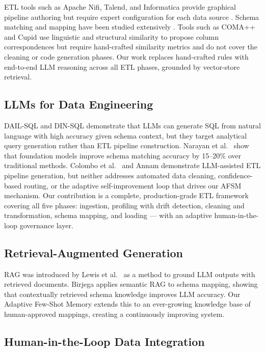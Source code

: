 \documentclass[9pt,a4paper,twocolumn,twoside]{rho-class/rho}
\begin{document}
        ETL tools such as Apache Nifi, Talend, and Informatica provide graphical pipeline authoring but require expert configuration for each data source \cite{el-sappagh2011etl}. Schema matching and mapping have been studied extensively \cite{rahm2001survey}. Tools such as COMA++ \cite{do2005coma} and Cupid \cite{madhavan2001generic} use linguistic and structural similarity to propose column correspondences but require hand-crafted similarity metrics and do not cover the cleaning or code generation phases. Our work replaces hand-crafted rules with end-to-end LLM reasoning across all ETL phases, grounded by vector-store retrieval.

    \subsection{LLMs for Data Engineering}

        DAIL-SQL \cite{gao2023dail} and DIN-SQL \cite{pourreza2023din} demonstrate that LLMs can generate SQL from natural language with high accuracy given schema context, but they target analytical query generation rather than ETL pipeline construction. Narayan et al.\ \cite{narayan2022foundation} show that foundation models improve schema matching accuracy by 15--20\% over traditional methods. Colombo et al.\ \cite{colombo2025llmetl} and Annam \cite{annam2025llm} demonstrate LLM-assisted ETL pipeline generation, but neither addresses automated data cleaning, confidence-based routing, or the adaptive self-improvement loop that drives our AFSM mechanism. Our contribution is a complete, production-grade ETL framework covering all five phases: ingestion, profiling with drift detection, cleaning and transformation, schema mapping, and loading --- with an adaptive human-in-the-loop governance layer.

    \subsection{Retrieval-Augmented Generation}

        RAG was introduced by Lewis et al.\ \cite{lewis2020retrieval} as a method to ground LLM outputs with retrieved documents. Birjega \cite{birjega2025semantic} applies semantic RAG to schema mapping, showing that contextually retrieved schema knowledge improves LLM accuracy. Our Adaptive Few-Shot Memory extends this to an ever-growing knowledge base of human-approved mappings, creating a continuously improving system.

    \subsection{Human-in-the-Loop Data Integration}
\end{document}

